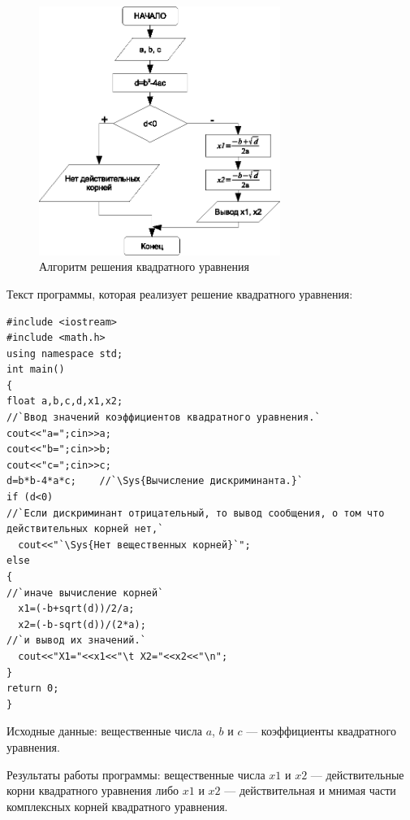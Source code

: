 \begin{figure}[htb]
\begin{center}
\includegraphics[width=0.7\textwidth]{img/ris_3_15}
\caption{Алгоритм решения квадратного уравнения}
\label{ch03:refDrawing14}
\end{center}
\end{figure}

Текст программы, которая реализует решение квадратного уравнения: 
\begin{lstlisting}
#include <iostream>
#include <math.h>
using namespace std;
int main()
{
float a,b,c,d,x1,x2;
//`Ввод значений коэффициентов квадратного уравнения.`
cout<<"a=";cin>>a;
cout<<"b=";cin>>b;
cout<<"c=";cin>>c;
d=b*b-4*a*c;	//`\Sys{Вычисление дискриминанта.}`
if (d<0)        
//`Если дискриминант отрицательный, то вывод сообщения, о том что действительных корней нет,`
  cout<<"`\Sys{Нет вещественных корней}`";
else
{
//`иначе вычисление корней`
  x1=(-b+sqrt(d))/2/a;
  x2=(-b-sqrt(d))/(2*a);
//`и вывод их значений.`
  cout<<"X1="<<x1<<"\t X2="<<x2<<"\n";
}
return 0;
}
\end{lstlisting}


Исходные данные: вещественные числа $a$, $b$ и $c$ --- коэффициенты
квадратного уравнения.

Результаты работы программы: вещественные числа $x1$ и $x2$ --- действительные корни
квадратного уравнения либо $x1$ и $x2$ --- действительная и мнимая части комплексных
корней квадратного уравнения.

